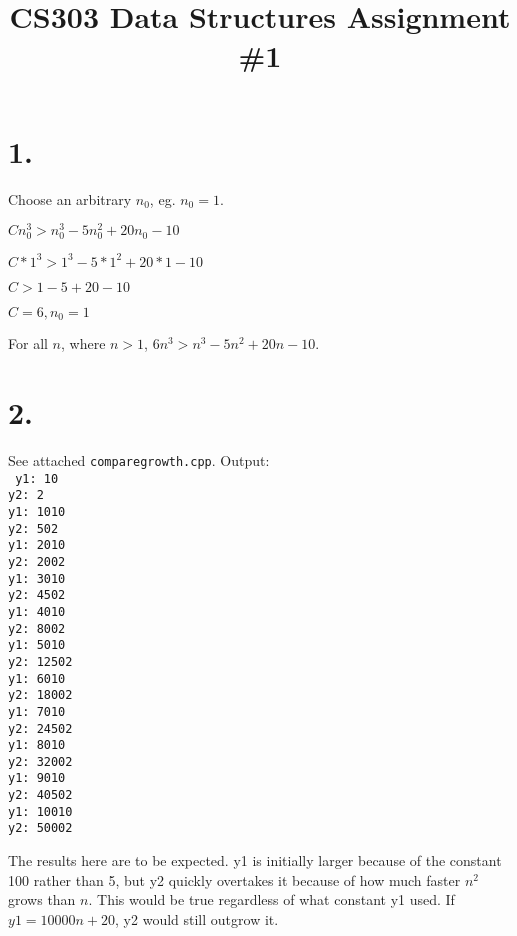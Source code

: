 \documentclass[12pt]{article}
\title{CS303 Data Structures Assignment \#1}
\begin{document}
\maketitle

\section*{1.}
{\small
Choose an arbitrary \(n_0\), eg. \(n_0=1\).

\(Cn_0^3>n_0^3-5n_0^2+20n_0-10\)

\(C*1^3>1^3-5*1^2+20*1-10\)

\(C>1-5+20-10\)

\(C=6, n_0=1\)\\
}
For all \(n\), where \(n>1\), \(6n^3>n^3-5n^2+20n-10\).\\

\section*{2.}
See attached \texttt{comparegrowth.cpp}. Output:\\
\texttt{
y1: 10\\
y2: 2\\
y1: 1010\\
y2: 502\\
y1: 2010\\
y2: 2002\\
y1: 3010\\
y2: 4502\\
y1: 4010\\
y2: 8002\\
y1: 5010\\
y2: 12502\\
y1: 6010\\
y2: 18002\\
y1: 7010\\
y2: 24502\\
y1: 8010\\
y2: 32002\\
y1: 9010\\
y2: 40502\\
y1: 10010\\
y2: 50002\\
}

The results here are to be expected. y1 is initially larger because of the constant 100 rather than 5, but y2 quickly overtakes it because of how much faster \(n^2\) grows than \(n\). This would be true regardless of what constant y1 used. If \(y1=10000n +20\), y2 would still outgrow it.\\
\end{document}
